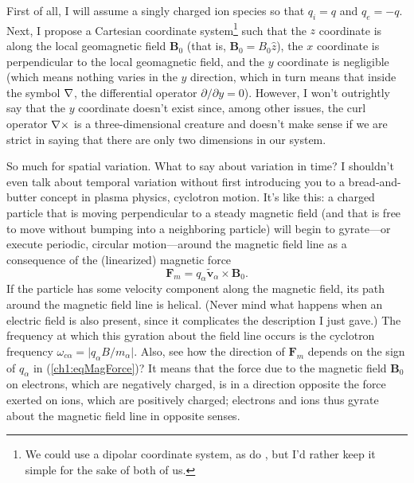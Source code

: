 First of all, I will assume a singly charged ion species so that $q_i = q$ and
$q_e = -q$. Next, I propose a Cartesian coordinate system\footnote{We could use
  a dipolar coordinate system, as do \citet{Lysak2013}, but I'd rather keep it
  simple for the sake of both of us.} such that the $z$ coordinate is along the
local geomagnetic field $\mathbf{B}_0$ (that is, $\mathbf{B}_0 = B_0 \hat{z}$),
the $x$ coordinate is perpendicular to the local geomagnetic field, and the $y$
coordinate is negligible (which means nothing varies in the $y$ direction, which
in turn means that inside the symbol ${\bf \nabla}$, the differential operator
$\partial / \partial y = 0$). However, I won't outrightly say that the $y$
coordinate doesn't exist since, among other issues, the curl operator
${\bf \nabla} \times$ is a three-dimensional creature and doesn't make sense if we are
strict in saying that there are only two dimensions in our system.

So much for spatial variation. What to say about variation in time? I shouldn't
even talk about temporal variation without first introducing you to a
bread-and-butter concept in plasma physics, cyclotron motion. It's like this: a
charged particle that is moving perpendicular to a steady magnetic field (and
that is free to move without bumping into a neighboring particle) will begin to
gyrate---or execute periodic, circular motion---around the magnetic field line
as a consequence of the (linearized) magnetic force
\begin{equation} \label{ch1:eqMagForce} 
\mathbf{F}_m = q_\alpha \mathbf{\tilde v}_\alpha \times \mathbf{B}_0.
\end{equation} 
If the particle has some velocity component along the magnetic field, its path
around the magnetic field line is helical. (Never mind what happens when an
electric field is also present, since it complicates the description I just
gave.) The frequency at which this gyration about the field line occurs is the
cyclotron frequency $\omega_{c \alpha} = \vert q_\alpha B /m_\alpha \vert$.
Also, see how the direction of $\mathbf{F}_m$ depends on the sign of $q_\alpha$
in (\ref{ch1:eqMagForce})? It means that the force due to the magnetic field
$\mathbf{B}_0$ on electrons, which are negatively charged, is in a direction
opposite the force exerted on ions, which are positively charged; electrons and
ions thus gyrate about the magnetic field line in opposite senses.


